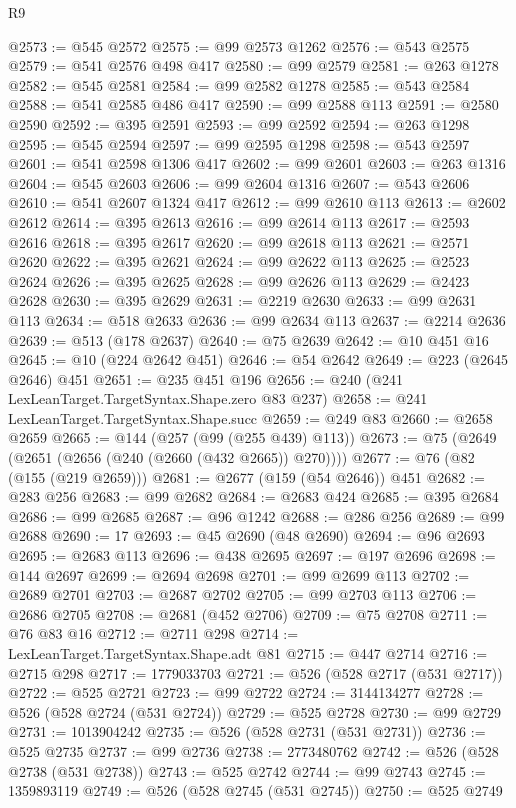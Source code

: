 \begin{lexlean}{R9}
\begin{coremodule}
{{{{{{{{{{{{{{{{{{{{{{{{{{{{{{{{{{{{{{{{{{{{{{{{{{{{{{{{{{{{{{{{{{{{{{{{{{{{{{{{{{{{@2573 := @545 @2572
@2575 := @99 @2573 @1262
@2576 := @543 @2575
@2579 := @541 @2576 @498 @417
@2580 := @99 @2579
@2581 := @263 @1278
@2582 := @545 @2581
@2584 := @99 @2582 @1278
@2585 := @543 @2584
@2588 := @541 @2585 @486 @417
@2590 := @99 @2588 @113
@2591 := @2580 @2590
@2592 := @395 @2591
@2593 := @99 @2592
@2594 := @263 @1298
@2595 := @545 @2594
@2597 := @99 @2595 @1298
@2598 := @543 @2597
@2601 := @541 @2598 @1306 @417
@2602 := @99 @2601
@2603 := @263 @1316
@2604 := @545 @2603
@2606 := @99 @2604 @1316
@2607 := @543 @2606
@2610 := @541 @2607 @1324 @417
@2612 := @99 @2610 @113
@2613 := @2602 @2612
@2614 := @395 @2613
@2616 := @99 @2614 @113
@2617 := @2593 @2616
@2618 := @395 @2617
@2620 := @99 @2618 @113
@2621 := @2571 @2620
@2622 := @395 @2621
@2624 := @99 @2622 @113
@2625 := @2523 @2624
@2626 := @395 @2625
@2628 := @99 @2626 @113
@2629 := @2423 @2628
@2630 := @395 @2629
@2631 := @2219 @2630
@2633 := @99 @2631 @113
@2634 := @518 @2633
@2636 := @99 @2634 @113
@2637 := @2214 @2636
@2639 := @513 (@178 @2637)
@2640 := @75 @2639
@2642 := @10 @451 @16
@2645 := @10 (@224 @2642 @451)
@2646 := @54 @2642
@2649 := @223 (@2645 @2646) @451
@2651 := @235 @451 @196
@2656 := @240 (@241 LexLeanTarget.TargetSyntax.Shape.zero @83 @237)
@2658 := @241 LexLeanTarget.TargetSyntax.Shape.succ
@2659 := @249 @83
@2660 := @2658 @2659
@2665 := @144 (@257 (@99 (@255 @439) @113))
@2673 := @75 (@2649 (@2651 (@2656 (@240 (@2660 (@432 @2665)) @270))))
@2677 := @76 (@82 (@155 (@219 @2659)))
@2681 := @2677 (@159 (@54 @2646)) @451
@2682 := @283 @256
@2683 := @99 @2682
@2684 := @2683 @424
@2685 := @395 @2684
@2686 := @99 @2685
@2687 := @96 @1242
@2688 := @286 @256
@2689 := @99 @2688
@2690 := 17
@2693 := @45 @2690 (@48 @2690)
@2694 := @96 @2693
@2695 := @2683 @113
@2696 := @438 @2695
@2697 := @197 @2696
@2698 := @144 @2697
@2699 := @2694 @2698
@2701 := @99 @2699 @113
@2702 := @2689 @2701
@2703 := @2687 @2702
@2705 := @99 @2703 @113
@2706 := @2686 @2705
@2708 := @2681 (@452 @2706)
@2709 := @75 @2708
@2711 := @76 @83 @16
@2712 := @2711 @298
@2714 := LexLeanTarget.TargetSyntax.Shape.adt @81
@2715 := @447 @2714
@2716 := @2715 @298
@2717 := 1779033703
@2721 := @526 (@528 @2717 (@531 @2717))
@2722 := @525 @2721
@2723 := @99 @2722
@2724 := 3144134277
@2728 := @526 (@528 @2724 (@531 @2724))
@2729 := @525 @2728
@2730 := @99 @2729
@2731 := 1013904242
@2735 := @526 (@528 @2731 (@531 @2731))
@2736 := @525 @2735
@2737 := @99 @2736
@2738 := 2773480762
@2742 := @526 (@528 @2738 (@531 @2738))
@2743 := @525 @2742
@2744 := @99 @2743
@2745 := 1359893119
@2749 := @526 (@528 @2745 (@531 @2745))
@2750 := @525 @2749
}}}}}}}}}}}}}}}}}}}}}}}}}}}}}}}}}}}}}}}}}}}}}}}}}}}}}}}}}}}}}}}}}}}}}}}}}}}}}}}}}}}}
\end{coremodule}
\end{lexlean}
